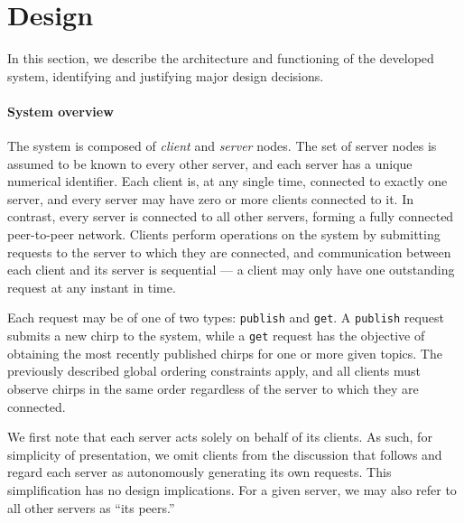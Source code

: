 
\section{Design}
\label{sec:design}

In this section, we describe the architecture and functioning of the developed system, identifying and justifying major design decisions.


\paragraph{System overview}


The system is composed of \emph{client} and \emph{server} nodes. The set of server nodes is assumed to be known to every other server, and each server has a unique numerical identifier. Each client is, at any single time, connected to exactly one server, and every server may have zero or more clients connected to it. In contrast, every server is connected to all other servers, forming a fully connected peer-to-peer network. Clients perform operations on the system by submitting requests to the server to which they are connected, and communication between each client and its server is sequential --- a client may only have one outstanding request at any instant in time.

Each request may be of one of two types: \texttt{publish} and \texttt{get}. A \texttt{publish} request submits a new chirp to the system, while a \texttt{get} request has the objective of obtaining the most recently published chirps for one or more given topics. The previously described global ordering constraints apply, and all clients must observe chirps in the same order regardless of the server to which they are connected.

We first note that each server acts solely on behalf of its clients. As such, for simplicity of presentation, we omit clients from the discussion that follows and regard each server as autonomously generating its own requests. This simplification has no design implications. For a given server, we may also refer to all other servers as ``its peers.''

